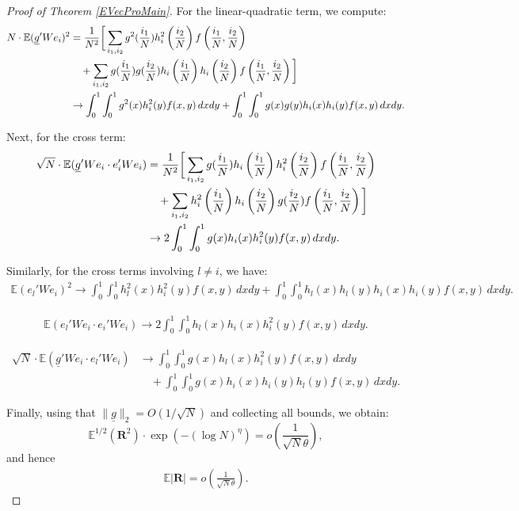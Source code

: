 \documentclass[11pt, reqno]{amsart}
\numberwithin{equation}{section}
\begin{document}
\begin{proof}[Proof of Theorem \ref{EVecProMain}]
For the linear-quadratic term, we compute:
\begin{align}
\nonumber
N \cdot \mathbb{E}(\underline g' W e_i)^2 
&= \frac{1}{N^2} \bigg[
\sum_{i_1, i_2} g^2(\frac{i_1}{N}) h_i^2\left( \frac{i_2}{N} \right) f\left( \frac{i_1}{N}, \frac{i_2}{N} \right) \\
&\quad + \sum_{i_1, i_2} g(\frac{i_1}{N}) g(\frac{i_2}{N}) h_i\left( \frac{i_1}{N} \right) h_i\left( \frac{i_2}{N} \right) f\left( \frac{i_1}{N}, \frac{i_2}{N} \right) \bigg] \notag \\
\label{EVecproTh1.6}
&\to \int_0^1 \int_0^1 g^2(x) h_i^2(y) f(x,y)\, dxdy 
+ \int_0^1 \int_0^1 g(x) g(y) h_i(x) h_i(y) f(x,y)\, dxdy.
\end{align}

Next, for the cross term:
\begin{align}
\nonumber
\sqrt{N} \cdot \mathbb{E}(\underline g' W e_i \cdot e_i' W e_i) 
&= \frac{1}{N^2} \bigg[
\sum_{i_1,i_2} g(\frac{i_1}{N}) h_i\left( \frac{i_1}{N} \right) h_i^2\left( \frac{i_2}{N} \right) f\left( \frac{i_1}{N}, \frac{i_2}{N} \right) \\
&\quad + \sum_{i_1,i_2} h_i^2\left( \frac{i_1}{N} \right) h_i\left( \frac{i_2}{N} \right) g(\frac{i_2}{N}) f\left( \frac{i_1}{N}, \frac{i_2}{N} \right) \bigg] \notag \\
\label{EVecproTh1.7}
&\to 2 \int_0^1 \int_0^1 g(x) h_i(x) h_i^2(y) f(x,y)\, dxdy.
\end{align}

Similarly, for the cross terms involving \( l \ne i \), we have:
\begin{align}
\label{EVecproTh1.9}
\mathbb{E}(e_l' W e_i)^2 
\to \int_0^1 \int_0^1 h_l^2(x) h_i^2(y) f(x,y)\, dxdy 
+ \int_0^1 \int_0^1 h_l(x) h_l(y) h_i(x) h_i(y) f(x,y)\, dxdy.
\end{align}

\begin{align}
\label{EVecproTh1.10}
\mathbb{E}(e_l' W e_i \cdot e_i' W e_i) 
\to 2 \int_0^1 \int_0^1 h_l(x) h_i(x) h_i^2(y) f(x,y)\, dxdy.
\end{align}

\begin{align}
\nonumber
\sqrt{N} \cdot \mathbb{E}(\underline g' W e_i \cdot e_l' W e_i) 
&\to \int_0^1 \int_0^1 g(x) h_l(x) h_i^2(y) f(x,y)\, dxdy \\
\label{EVecproTh1.11}
&\quad + \int_0^1 \int_0^1 g(x) h_i(x) h_i(y) h_l(y) f(x,y)\, dxdy.
\end{align}

Finally, using that \( \|\underline g\|_2 = O(1/\sqrt{N}) \) and collecting all bounds, we obtain:
\[
\mathbb{E}^{1/2}(\mathbf{R}^2) \cdot \exp(-(\log N)^\eta) = o\left( \frac{1}{\sqrt{N} \theta} \right),
\]
and hence
\begin{align}
\label{EVecproTh1.8}
\mathbb{E}|\mathbf{R}| = o\left( \frac{1}{\sqrt{N} \theta} \right).
\end{align}


\end{proof}
\end{document}
